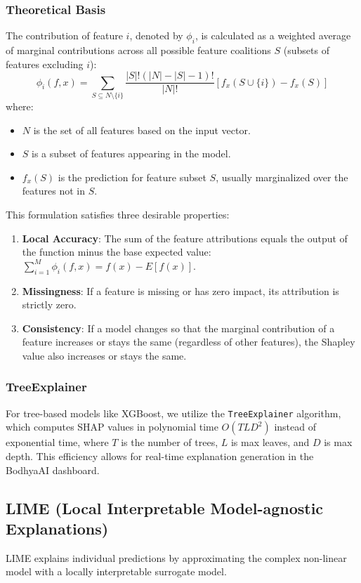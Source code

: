 \documentclass[12pt,a4paper]{report}
\begin{document}
\subsubsection{Theoretical Basis}
The contribution of feature $i$, denoted by $\phi_i$, is calculated as a weighted average of marginal contributions across all possible feature coalitions $S$ (subsets of features excluding $i$):
\begin{equation}
\phi_i(f, x) = \sum_{S \subseteq N \setminus \{i\}} \frac{|S|! (|N| - |S| - 1)!}{|N|!} [f_x(S \cup \{i\}) - f_x(S)]
\label{eq:shap_value}
\end{equation}
where:
\begin{itemize}
    \item $N$ is the set of all features based on the input vector.
    \item $S$ is a subset of features appearing in the model.
    \item $f_x(S)$ is the prediction for feature subset $S$, usually marginalized over the features not in $S$.
\end{itemize}
This formulation satisfies three desirable properties:
\begin{enumerate}
    \item \textbf{Local Accuracy}: The sum of the feature attributions equals the output of the function minus the base expected value: $\sum_{i=1}^M \phi_i(f, x) = f(x) - E[f(x)]$.
    \item \textbf{Missingness}: If a feature is missing or has zero impact, its attribution is strictly zero.
    \item \textbf{Consistency}: If a model changes so that the marginal contribution of a feature increases or stays the same (regardless of other features), the Shapley value also increases or stays the same.
\end{enumerate}

\subsubsection{TreeExplainer}
For tree-based models like XGBoost, we utilize the \texttt{TreeExplainer} algorithm, which computes SHAP values in polynomial time $O(TLD^2)$ instead of exponential time, where $T$ is the number of trees, $L$ is max leaves, and $D$ is max depth. This efficiency allows for real-time explanation generation in the BodhyaAI dashboard.

\subsection{LIME (Local Interpretable Model-agnostic Explanations)}
LIME explains individual predictions by approximating the complex non-linear model with a locally interpretable surrogate model.
\end{document}
